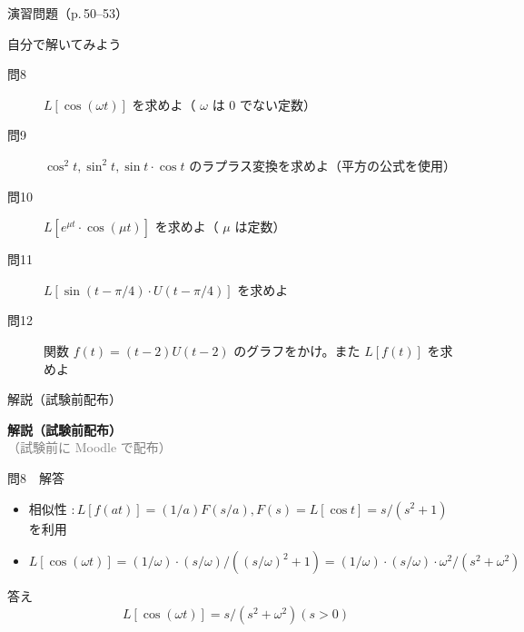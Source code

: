 \documentclass[aspectratio=43,professionalfonts,handout]{beamer}
\begin{document}
\begin{frame}{演習問題（p.\,50--53）}
  \begin{exampleblock}{自分で解いてみよう}
  \begin{description}
    \item[問8] $L[\cos(\omega t)]$ を求めよ（ $\omega$ は 0 でない定数）
    \item[問9] $\cos^{2}t, \sin^{2}t, \sin t\cdot \cos t$ のラプラス変換を求めよ（平方の公式を使用）
    \item[問10] $L[e^{\mu t}\cdot \cos(\mu t)]$ を求めよ（ $\mu$ は定数）
    \item[問11] $L[\sin(t - \pi/4)\cdot U(t - \pi/4)]$ を求めよ
    \item[問12] 関数 $f(t) = (t-2)U(t-2)$ のグラフをかけ。また $L[f(t)]$ を求めよ
  \end{description}
  \end{exampleblock}
\end{frame}

\begin{frame}{解説（試験前配布）}
  \vfill
  \begin{center}
  {\LARGE\bfseries\color{structure.fg} 解説（試験前配布）}\\[1em]
  {\normalsize\textcolor{gray}{（試験前に Moodle で配布）}}
  \end{center}
  \vfill
\end{frame}

\begin{frame}{問8　解答}
  \begin{block}{}
  \begin{itemize}\setlength{\itemsep}{2pt}
    \item 相似性 $: L[f(at)] = (1/a)F(s/a), F(s) = L[\cos t] = s/(s^{2}+1)$ を利用
    \item $L[\cos(\omega t)] = (1/\omega)\cdot(s/\omega)/((s/\omega)^{2}+1) = (1/\omega)\cdot(s/\omega)\cdot\omega^{2}/(s^{2}+\omega^{2})$
  \end{itemize}
  \end{block}
  \begin{exampleblock}{答え}
    \[
    L[\cos(\omega t)] = s/(s^{2}+\omega^{2})  (s > 0)
  \]
  \end{exampleblock}
\end{frame}
\end{document}
